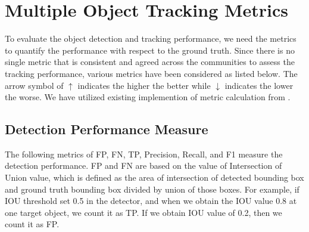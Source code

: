 \section{Multiple Object Tracking Metrics}
\label{sec:background/section_d}

To evaluate the object detection and tracking performance, we need the metrics to quantify the performance with respect to the ground truth. Since there is no single metric that is consistent and agreed across the communities to assess the tracking performance, various metrics have been considered as listed below. The arrow symbol of $\uparrow$ indicates the higher the better while $\downarrow$ indicates the lower the worse. We have utilized existing implemention of metric calculation from \cite{heindl_cheindpy-motmetrics_2021}. 

\subsection{Detection Performance Measure}
The following metrics of FP, FN, TP, Precision, Recall, and F1 measure the detection performance. FP and FN are based on the value of Intersection of Union value, which is defined as the area of intersection of detected bounding box and ground truth bounding box divided by union of those boxes. For example, if IOU threshold set 0.5 in the detector, and when we obtain the IOU value 0.8 at one target object, we count it as TP. If we obtain IOU value of 0.2, then we count it as FP.

